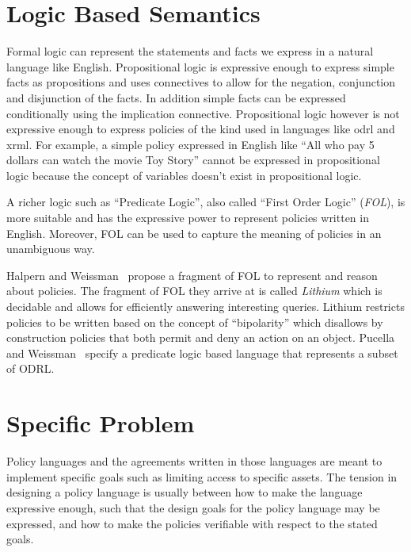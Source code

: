 \section{Logic Based Semantics}


Formal logic can represent the statements and facts we express in a natural language like English. Propositional logic is expressive enough to express simple facts as propositions and uses connectives to allow for the negation, conjunction and disjunction of the facts. In addition simple facts can be expressed conditionally using the implication connective. Propositional logic however is not expressive enough to express policies of the kind used in languages like \ac{odrl} and \ac{xrml}. For example, a simple policy expressed in English like ``All who pay 5 dollars can watch the movie Toy Story'' cannot be expressed in propositional logic because the concept of  variables doesn't exist in propositional logic. 

A richer logic such as ``Predicate Logic'', also called ``First Order Logic'' (\emph{FOL}), is more suitable and has the expressive power to represent policies written in English. Moreover, FOL can be used to capture the meaning of policies in an unambiguous way.

Halpern and Weissman~\cite{Halpern2008} propose a fragment of FOL to represent and reason about policies. The fragment of FOL they arrive at is called \emph{Lithium} which is decidable and allows for efficiently answering interesting queries. Lithium restricts policies to be written based on the concept of ``bipolarity'' which disallows by construction policies that both permit and deny an action on an object. Pucella and Weissman~\cite{pucella2006} specify a predicate logic based language that represents a subset of ODRL.


\section{Specific Problem}

Policy languages and the agreements written in those languages are meant to implement specific goals such as limiting access to specific assets. The tension in designing a policy language is usually between how to make the language expressive enough, such that the design goals for the policy language may be expressed, and how to make the policies verifiable with respect to the stated goals.

